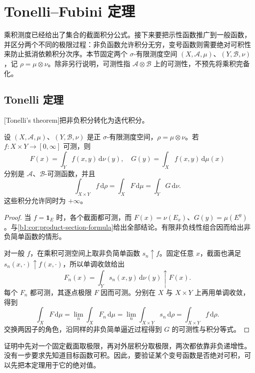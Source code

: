 \section{Tonelli–Fubini 定理}
\label{b1:sec:0703}

乘积测度已经给出了集合的截面积分公式。接下来要把示性函数推广到一般函数，并区分两个不同的极限过程：非负函数允许积分无穷，变号函数则需要绝对可积性来防止抵消依赖积分次序。本节固定两个 \(\sigma\)-有限测度空间 \((X,\mathcal A,\mu)\)、\((Y,\mathcal B,\nu)\)，记 \(\rho=\mu\otimes\nu\)。除非另行说明，可测性指 \(\mathcal A\otimes\mathcal B\) 上的可测性，不预先将乘积完备化。

\subsection{Tonelli 定理}
\label{b1:subsec:070301}

[Tonelli's theorem]把非负积分转化为迭代积分。

\begin{theorem}[Tonelli]\label{b1:thm:tonelli}
设 \((X,\mathcal A,\mu)\)、\((Y,\mathcal B,\nu)\) 是正 \(\sigma\)-有限测度空间，\(\rho=\mu\otimes\nu\)。若 \(f:X\times Y\rightarrow[0,\infty]\) 可测，则
\[
F(x)=\int_Y f(x,y)\,\mathrm d\nu(y),\quad
G(y)=\int_X f(x,y)\,\mathrm d\mu(x)
\]
分别是 \(\mathcal A\)、\(\mathcal B\)-可测函数，并且
\[
\int_{X\times Y}f\,\mathrm d\rho
=\int_X F\,\mathrm d\mu
=\int_Y G\,\mathrm d\nu.
\]
这些积分允许同时为 \(+\infty\)。
\end{theorem}
\begin{proof}
当 \(f=\mathbf1_E\) 时，各个截面都可测，而 \(F(x)=\nu(E_x)\)、\(G(y)=\mu(E^y)\)。与\cref{b1:cor:product-section-formula}给出全部结论。有限非负线性组合因而给出非负简单函数的情形。

对一般 \(f\)，在乘积可测空间上取非负简单函数 \(s_n\uparrow f\)。固定任意 \(x\)，截面也满足 \(s_n(x,\cdot)\uparrow f(x,\cdot)\)，所以单调收敛给出
\[
F_n(x)=\int_Ys_n(x,y)\,\mathrm d\nu(y)\uparrow F(x).
\]
每个 \(F_n\) 都可测，其逐点极限 \(F\) 因而可测。分别在 \(X\) 与 \(X\times Y\) 上再用单调收敛，得到
\[
\int_XF\,\mathrm d\mu
=\lim_n\int_XF_n\,\mathrm d\mu
=\lim_n\int_{X\times Y}s_n\,\mathrm d\rho
=\int_{X\times Y}f\,\mathrm d\rho.
\]
交换两因子的角色，沿同样的非负简单逼近过程得到 \(G\) 的可测性与积分等式。
\end{proof}

证明中先对一个固定截面取极限，再对外层积分取极限，两次都依靠非负递增性。没有一步要求先知道目标函数可积。因此，要验证某个变号函数是否绝对可积，可以先把本定理用于它的绝对值。

